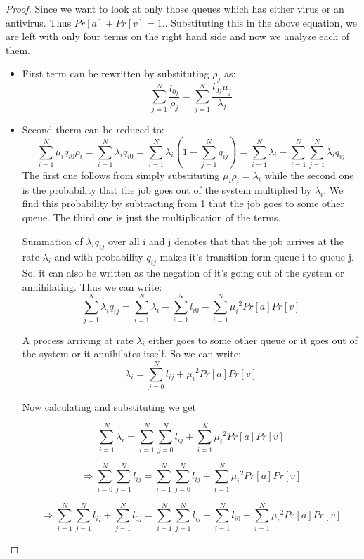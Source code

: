 \begin{proof}
Since we want to look at only those queues which has either virus or an antivirus. Thus $Pr[a]+Pr[v]=1. $. Substituting this in the above equation, we are left with only four terms on the right hand side and now we analyze each of them.

\begin{itemize}
\item First term can be rewritten by substituting $\rho_j$ as:  $$\sum_{j=1}^{N}\frac{l_{0j}}{\rho_j}= \sum_{j=1}^{N}\frac{l_{0j}\mu_j}{\lambda_j}$$ 

\item Second therm can be reduced to:
\begin{equation}
\sum_{i=1}^{N}\mu_iq_{i0}\rho_i = \sum_{i=1}^{N}
\lambda_iq_{i0} = \sum_{i=1}^{N}
\lambda_i(1-\sum_{j=1}^{N}q_{ij})=
\sum_{i=1}^{N}\lambda_i-\sum_{i=1}^{N}
\sum_{j=1}^{N}\lambda_iq_{ij}
\end{equation}
The first one follows from simply substituting $\mu_i\rho_i=\lambda_i$ while the second one is the probability that the job goes out of the system multiplied by $\lambda_i$. We find this probability by subtracting from 1 that the job goes to some other queue. The third one is just the multiplication of the terms.

Summation of $\lambda_iq_{ij}$ over all i and j denotes that that the job arrives at the rate $\lambda_i$ and with probability $q_{ij}$ makes it's transition form queue i to queue j. So, it can also be written as the negation of it's going out of the system or annihilating. Thus we can write:
\begin{equation}
\sum_{j=1}^{N}\lambda_iq_{ij}=\sum_{i=1}^{N}\lambda_i-
\sum_{i=1}^{N}l_{i0}-\sum_{i=1}^{N}{\mu_{i}}^{2}Pr[a]Pr[v]
\end{equation}

A process arriving at rate $\lambda_i$ either goes to some  other queue or it goes out of the system or it annihilates itself. So we can write: 
$$\lambda_i=\sum_{j=0}^{N}l_{ij}+{\mu_{i}}^{2}Pr[a]Pr[v]$$ 

Now calculating and substituting we get

$$\sum_{i=1}^{N}\lambda_i=\sum_{i=1}^{N}
\sum_{j=0}^{N}l_{ij}+\sum_{i=1}^{N}{\mu_{i}}^{2}Pr[a]Pr[v]$$ 

$$\Rightarrow\sum_{i=0}^{N}\sum_{j=1}^{N}l_{ij}=\sum_{i=1}^{N}
\sum_{j=0}^{N}l_{ij}+\sum_{i=1}^{N}{\mu_{i}}^{2}Pr[a]Pr[v] $$

$$\Rightarrow\sum_{i=1}^{N}\sum_{j=1}^{N}l_{ij} + \sum_{j=1}^{N}l_{0j}=\sum_{i=1}^{N}
\sum_{j=1}^{N}l_{ij}+\sum_{i=1}^{N}l_{i0}+\sum_{i=1}^{N}{\mu_{i}}^{2}Pr[a]Pr[v] $$


\end{itemize}
\end{proof}
